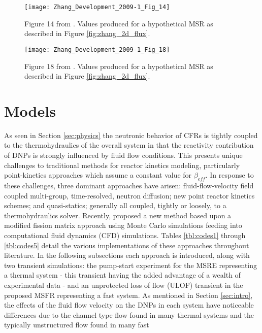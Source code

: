 \documentclass[review]{elsarticle}
\begin{document}
\begin{figure}[H]
   \centering
   \texttt{[image: Zhang\_Development\_2009-1\_Fig\_14]}
   \caption{Figure 14 from \cite{zhang_development_2009-1}. Values produced for a hypothetical
   MSR as described in Figure \ref{fig:zhang_2d_flux}.}
   \label{fig:zhang_velocity_keff}
\end{figure}

\begin{figure}[H]
   \centering
   \texttt{[image: Zhang\_Development\_2009-1\_Fig\_18]}
   \caption{Figure 18 from \cite{zhang_development_2009-1}. Values produced for a hypothetical MSR
   as described in Figure \ref{fig:zhang_2d_flux}.} 
   \label{fig:zhang_residence_time_keff}
\end{figure}

\section{Models} \label{sec:models}
As seen in Section \ref{sec:physics} the neutronic behavior of CFRs is tightly
coupled to the thermohydraulics of the overall system in that the reactivity 
contribution of DNPs is strongly influenced by fluid flow conditions.
This presents unique
challenges to traditional methods for reactor kinetics modeling, particularly
point-kinetics approaches which assume a constant value for $\beta_{eff}$. In
response to these challenges, three dominant approaches have arisen: 
fluid-flow-velocity field coupled multi-group, time-resolved, neutron diffusion;
new point reactor kinetics schemes; and quasi-statics; generally all coupled, tightly
or loosely, to a thermohydraulics solver. Recently,
\cite{laureau_coupled_2015} proposed a new method based upon a modified
fission matrix approach using Monte Carlo simulations feeding into
computational fluid dynamics (CFD) simulations. Tables \ref{tbl:codes1}
through \ref{tbl:codes5} detail
the various implementations of these approaches throughout literature.
In the following subsections
each approach is introduced, along with two transient simulations: the pump-start
experiment for the MSRE representing a thermal system - this transient having
the added advantage of a wealth of experimental data - and an unprotected loss
of flow (ULOF) transient in the proposed MSFR representing a fast system.
As mentioned in
Section \ref{sec:intro}, the effects of the fluid flow velocity on the DNPs in each
system have noticeable differences due to the channel type flow found in many
thermal systems and the typically unstructured flow found in many fast
\end{document}
